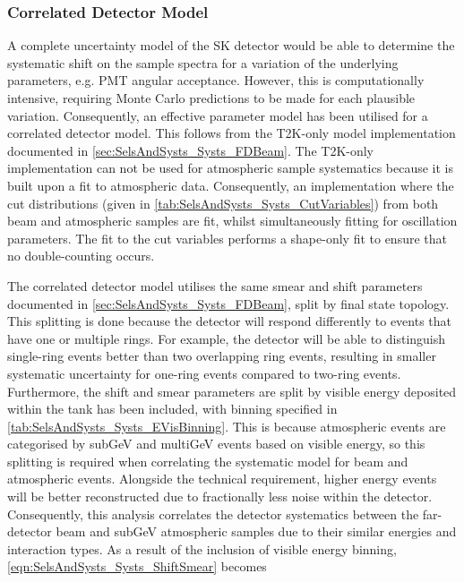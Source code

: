 \subsubsection{Correlated Detector Model}
\label{sec:SelsAndSysts_Systs_Correlated}

A complete uncertainty model of the SK detector would be able to determine the systematic shift on the sample spectra for a variation of the underlying parameters, e.g. PMT angular acceptance. However, this is computationally intensive, requiring Monte Carlo predictions to be made for each plausible variation. Consequently, an effective parameter model has been utilised for a correlated detector model. This follows from the T2K-only model implementation documented in \autoref{sec:SelsAndSysts_Systs_FDBeam}. The T2K-only implementation can not be used for atmospheric sample systematics because it is built upon a fit to atmospheric data. Consequently, an implementation where the cut distributions (given in \autoref{tab:SelsAndSysts_Systs_CutVariables}) from both beam and atmospheric samples are fit, whilst simultaneously fitting for oscillation parameters. The fit to the cut variables performs a shape-only fit to ensure that no double-counting occurs.

The correlated detector model utilises the same smear and shift parameters documented in \autoref{sec:SelsAndSysts_Systs_FDBeam}, split by final state topology. This splitting is done because the detector will respond differently to events that have one or multiple rings. For example, the detector will be able to distinguish single-ring events better than two overlapping ring events, resulting in smaller systematic uncertainty for one-ring events compared to two-ring events. Furthermore, the shift and smear parameters are split by visible energy deposited within the tank has been included, with binning specified in \autoref{tab:SelsAndSysts_Systs_EVisBinning}. This is because atmospheric events are categorised by subGeV and multiGeV events based on visible energy, so this splitting is required when correlating the systematic model for beam and atmospheric events. Alongside the technical requirement, higher energy events will be better reconstructed due to fractionally less noise within the detector. Consequently, this analysis correlates the detector systematics between the far-detector beam and subGeV atmospheric samples due to their similar energies and interaction types. As a result of the inclusion of visible energy binning, \autoref{eqn:SelsAndSysts_Systs_ShiftSmear} becomes

